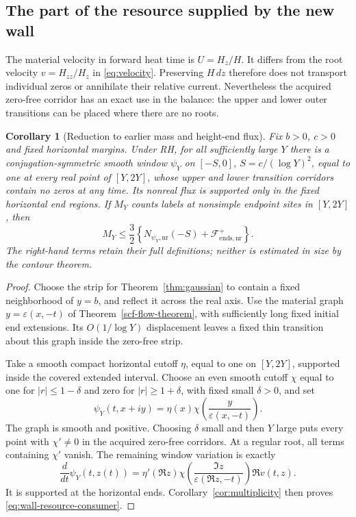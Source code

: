 \documentclass[11pt]{article}
\newcommand{\nr}{\mathrm{nr}}
\newcommand{\FF}{\mathcal F}
\newtheorem{corollary}[theorem]{Corollary}
\theoremstyle{remark}
\begin{document}
\subsection{The part of the resource supplied by the new wall}
\label{sec:wall-resource}

The material velocity in forward heat time is $U=H_z/H$.
It differs from the root velocity $v=H_{zz}/H_z$ in
\eqref{eq:velocity}. Preserving $H\,dz$ therefore does not transport
individual zeros or annihilate their relative current.
Nevertheless the acquired zero-free corridor has an exact use in the
balance: the upper and lower outer transitions can be placed where
there are no roots.

\begin{corollary}[Reduction to earlier mass and height-end flux]
\label{cor:wall-resource}
Fix $b>0$, $c>0$ and fixed horizontal margins. Under RH, for all
sufficiently large $Y$ there is a conjugation-symmetric smooth window
$\psi_Y$ on $[-S,0]$, $S=c/(\log Y)^2$, equal to one at every real
point of $[Y,2Y]$, whose upper and lower transition corridors contain
no zeros at any time. Its nonreal flux is supported only in the fixed
horizontal end regions. If $M_Y$ counts labels at nonsimple endpoint
sites in $[Y,2Y]$, then
\begin{equation}
 M_Y\le\frac32\left\{
 N_{\psi_Y,\nr}(-S)+\FF_{\mathrm{ends},\nr}^{+}\right\}.
 \label{eq:wall-resource-consumer}
\end{equation}
The right-hand terms retain their full definitions; neither is estimated
in size by the contour theorem.
\end{corollary}
\begin{proof}
Choose the strip for Theorem~\ref{thm:gaussian} to contain a fixed
neighborhood of $y=b$, and reflect it across the real axis. Use the
material graph $y=\varepsilon(x,-t)$ of
Theorem~\ref{scf-flow-theorem}, with sufficiently long fixed initial end
extensions. Its $O(1/\log Y)$ displacement leaves a fixed thin
transition about this graph inside the zero-free strip.

Take a smooth compact horizontal cutoff $\eta$, equal to one on
$[Y,2Y]$, supported inside the covered extended interval. Choose an
even smooth cutoff $\chi$ equal to one for $|r|\le1-\delta$ and zero
for $|r|\ge1+\delta$, with fixed small $\delta>0$, and set
\[
 \psi_Y(t,x+iy)=\eta(x)
       \chi\left(\frac{y}{\varepsilon(x,-t)}\right).
\]
The graph is smooth and positive. Choosing $\delta$ small and then $Y$
large puts every point with $\chi'\ne0$ in the acquired zero-free
corridors. At a regular root, all terms containing $\chi'$ vanish.
The remaining window variation is exactly
\[
 \frac{d}{dt}\psi_Y(t,z(t))
   =\eta'(\Re z)\chi\left(\frac{\Im z}
                                  {\varepsilon(\Re z,-t)}\right)
                         \Re v(t,z).
\]
It is supported at the horizontal ends. Corollary~\ref{cor:multiplicity}
then proves \eqref{eq:wall-resource-consumer}.
\end{proof}
\end{document}
